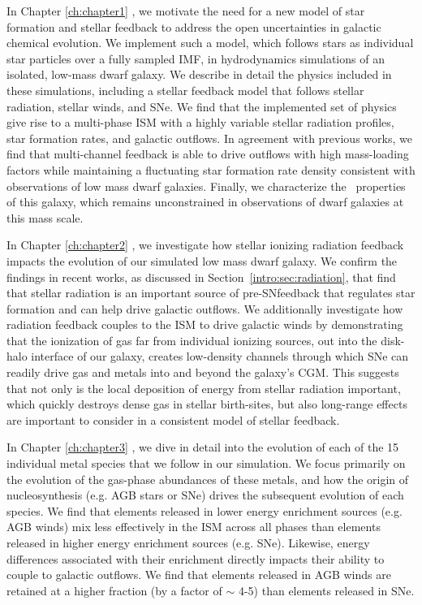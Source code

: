 In Chapter \ref{ch:chapter1} \citep[published as][]{Emerick2019}, we motivate the need for a new model of star formation and stellar feedback to address the open uncertainties in galactic chemical evolution. We implement such a model, which follows stars as individual star particles over a fully sampled IMF, in hydrodynamics simulations of an isolated, low-mass dwarf galaxy. We describe in detail the physics included in these simulations, including a stellar feedback model that follows stellar radiation, stellar winds, and SNe. We find that the implemented set of physics give rise to a multi-phase ISM with a highly variable stellar radiation profiles, star formation rates, and galactic outflows. In agreement with previous works, we find that multi-channel feedback is able to drive outflows with high mass-loading factors while maintaining a fluctuating star formation rate density consistent with observations of low mass dwarf galaxies. Finally, we characterize the \Hmolecular~properties of this galaxy, which remains unconstrained in observations of dwarf galaxies at this mass scale.

In Chapter \ref{ch:chapter2} \citep[published as][]{Emerick2018a}, we investigate how stellar ionizing radiation feedback impacts the evolution of our simulated low mass dwarf galaxy. We confirm the findings in recent works, as discussed in Section~\ref{intro:sec:radiation}, that find that stellar radiation is an important source of pre-SNfeedback that regulates star formation and can help drive galactic outflows. We additionally investigate how radiation feedback couples to the ISM to drive galactic winds by demonstrating that the ionization of gas far from individual ionizing sources, out into the disk-halo interface of our galaxy, creates low-density channels through which SNe can readily drive gas and metals into and beyond the galaxy's CGM. This suggests that not only is the local deposition of energy from stellar radiation important, which quickly destroys dense gas in stellar birth-sites, but also long-range effects are important to consider in a consistent model of stellar feedback.

In Chapter \ref{ch:chapter3} \citep[published as][]{Emerick2018b}, we dive in detail into the evolution of each of the 15 individual metal species that we follow in our simulation. We focus primarily on the evolution of the gas-phase abundances of these metals, and how the origin of nucleosynthesis (e.g. AGB stars or SNe) drives the subsequent evolution of each species. We find that elements released in lower energy enrichment sources (e.g. AGB winds) mix less effectively in the ISM across all phases than elements released in higher energy enrichment sources (e.g. SNe). Likewise, energy differences associated with their enrichment directly impacts their ability to couple to galactic outflows. We find that elements released in AGB winds are retained at a higher fraction (by a factor of $\sim$ 4-5) than elements released in SNe.

